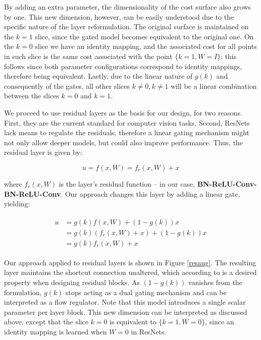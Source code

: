 \documentclass{article} \RequirePackage{amsmath,amsthm,amsfonts,amssymb}
\begin{document}
By adding an extra parameter, the dimensionality of the cost surface also grows by one. This new dimension, however, can be easily understood due to the specific nature of the layer reformulation. The original surface is maintained on the $k = 1$ slice, since the gated model becomes equivalent to the original one. On the $k = 0$ slice we have an identity mapping, and the associated cost for all points in such slice is the same cost associated with the point $\{k = 1, W = I\}$: this follows since both parameter configurations correspond to identity mappings, therefore being equivalent. Lastly, due to the linear nature of  $g(k)$ and consequently of the gates, all other slices $k \neq 0, k \neq 1$ will be a linear combination between the slices $k = 0$ and $k = 1$.

We proceed to use residual layers as the basis for our design, for two reasons. First, they are the current standard for computer vision tasks. Second, ResNets lack means to regulate the residuals, therefore a linear gating mechanism might not only allow deeper models, but could also improve performance. Thus, the residual layer is given by:

\begin{equation*}
	u = f(x,W) = f_r(x, W) + x
\end{equation*}

where $f_r(x,W)$ is the layer's residual function -- in our case, \textbf{BN-ReLU-Conv-BN-ReLU-Conv}. Our approach changes this layer by adding a linear gate, yielding:

\begin{align*}
\begin{split}
	 u &= g(k) f(x,W) + (1 - g(k))x \\
	&=  g(k) ( f_r(x, W) + x ) + (1 - g(k))x \\
	&= g(k) f_r(x,W) + x
\end{split}
\end{align*}

Our approach applied to residual layers is shown in Figure \ref{resaug}. The resulting layer maintains the shortcut connection unaltered, which according to \cite{resnet2} is a desired property when designing residual blocks. As $(1 - g(k))$ vanishes from the formulation, $g(k)$ stops acting as a dual gating mechanism and can be interpreted as a flow regulator. Note that this model introduces a single scalar parameter per layer block. This new dimension can be interpreted as discussed above, except that the slice $k = 0$ is equivalent to $\{k = 1, W = 0\}$, since an identity mapping is learned when $W = 0$ in ResNets.
\end{document}
